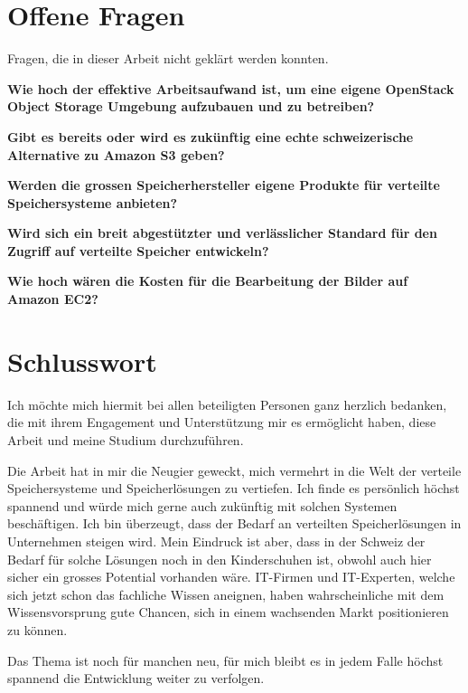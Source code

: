 \section{Offene Fragen}

Fragen, die in dieser Arbeit nicht geklärt werden konnten.

\textbf{Wie hoch der effektive Arbeitsaufwand ist, um eine eigene OpenStack Object Storage Umgebung aufzubauen und zu betreiben?}

\textbf{Gibt es bereits oder wird es zukünftig eine echte schweizerische Alternative zu Amazon S3 geben?}

\textbf{Werden die grossen Speicherhersteller eigene Produkte für verteilte Speichersysteme anbieten?}

\textbf{Wird sich ein breit abgestützter und verlässlicher Standard für den Zugriff auf verteilte Speicher entwickeln?}

\textbf{Wie hoch wären die Kosten für die Bearbeitung der Bilder auf Amazon EC2?}


\section{Schlusswort}
Ich möchte mich hiermit bei allen beteiligten Personen ganz herzlich bedanken, die mit ihrem Engagement und Unterstützung mir es ermöglicht haben, diese Arbeit und meine Studium durchzuführen. 

Die Arbeit hat in mir die Neugier geweckt, mich vermehrt in die Welt der verteile Speichersysteme und Speicherlösungen zu vertiefen. Ich finde es persönlich höchst spannend und würde mich gerne auch zukünftig mit solchen Systemen beschäftigen. Ich bin überzeugt, dass der Bedarf an verteilten Speicherlösungen in Unternehmen steigen wird. Mein Eindruck ist aber, dass in der Schweiz der Bedarf für solche Lösungen noch in den Kinderschuhen ist, obwohl auch hier sicher ein grosses Potential vorhanden wäre. IT-Firmen und IT-Experten, welche sich jetzt schon das fachliche Wissen aneignen, haben wahrscheinliche mit dem Wissensvorsprung gute Chancen, sich in einem wachsenden Markt positionieren zu können. 

Das Thema ist noch für manchen neu, für mich bleibt es in jedem Falle höchst spannend die Entwicklung weiter zu verfolgen. 